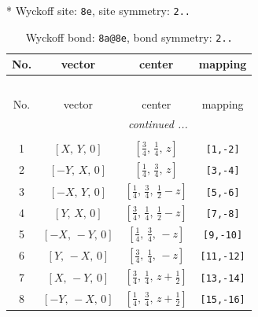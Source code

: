 \documentclass[fleqn,8pt]{jsarticle}
\begin{document}
* Wyckoff site: {\tt 8e}, site symmetry: {\tt 2..}
\renewcommand{\arraystretch}{1.2}
\begin{longtable}{cccc}
\caption{Wyckoff bond: {\tt 8a@8e}, bond symmetry: {\tt 2..}}
 \\
 \hline \hline
No. & vector & center & mapping \\ \hline \endfirsthead

\multicolumn{3}{l}{\tablename\ \thetable{}} \\
 \hline \hline
No. & vector & center & mapping \\ \hline \endhead

 \hline \hline
\multicolumn{3}{r}{\footnotesize\it continued ...} \\ \endfoot

 \hline \hline
\multicolumn{3}{r}{} \\ \endlastfoot

1 & $\left[ X,\, Y,\, 0 \right]$ & $\left[ \frac{3}{4},\, \frac{1}{4},\, z \right]$ & {\tt [1,-2]} \\ \hline
2 & $\left[ - Y,\, X,\, 0 \right]$ & $\left[ \frac{1}{4},\, \frac{3}{4},\, z \right]$ & {\tt [3,-4]} \\ \hline
3 & $\left[ - X,\, Y,\, 0 \right]$ & $\left[ \frac{1}{4},\, \frac{3}{4},\, \frac{1}{2} - z \right]$ & {\tt [5,-6]} \\ \hline
4 & $\left[ Y,\, X,\, 0 \right]$ & $\left[ \frac{3}{4},\, \frac{1}{4},\, \frac{1}{2} - z \right]$ & {\tt [7,-8]} \\ \hline
5 & $\left[ - X,\, - Y,\, 0 \right]$ & $\left[ \frac{1}{4},\, \frac{3}{4},\, - z \right]$ & {\tt [9,-10]} \\ \hline
6 & $\left[ Y,\, - X,\, 0 \right]$ & $\left[ \frac{3}{4},\, \frac{1}{4},\, - z \right]$ & {\tt [11,-12]} \\ \hline
7 & $\left[ X,\, - Y,\, 0 \right]$ & $\left[ \frac{3}{4},\, \frac{1}{4},\, z + \frac{1}{2} \right]$ & {\tt [13,-14]} \\ \hline
8 & $\left[ - Y,\, - X,\, 0 \right]$ & $\left[ \frac{1}{4},\, \frac{3}{4},\, z + \frac{1}{2} \right]$ & {\tt [15,-16]} \\
\end{longtable}
\renewcommand{\arraystretch}{1.2}
\end{document}
